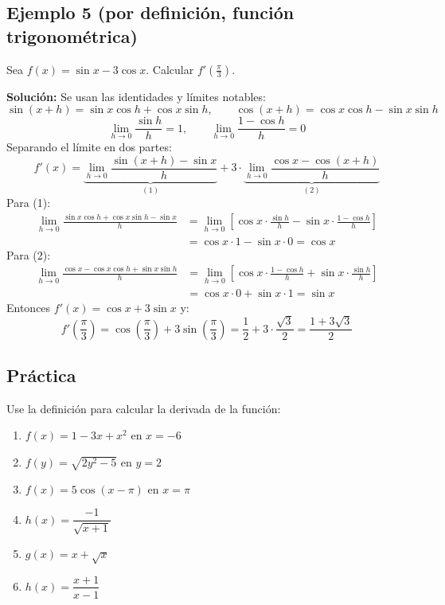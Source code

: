 \documentclass[12pt]{article}
\begin{document}
\subsection{Ejemplo 5 (por definición, función trigonométrica)}
Sea $f(x) = \sin x - 3\cos x$. Calcular $f'\left(\frac{\pi}{3}\right)$.

\textbf{Solución:} Se usan las identidades y límites notables:
\[
\sin(x + h) = \sin x \cos h + \cos x \sin h, \qquad \cos(x + h) = \cos x \cos h - \sin x \sin h
\]
\[
\lim_{h \to 0} \frac{\sin h}{h} = 1, \qquad \lim_{h \to 0} \frac{1 - \cos h}{h} = 0
\]
Separando el límite en dos partes:
\[
f'(x) = \underbrace{\lim_{h \to 0} \frac{\sin(x + h) - \sin x}{h}}_{(1)} + 3 \cdot \underbrace{\lim_{h \to 0} \frac{\cos x - \cos(x + h)}{h}}_{(2)}
\]
Para (1):
\begin{align*}
\lim_{h \to 0} \frac{\sin x \cos h + \cos x \sin h - \sin x}{h} &= \lim_{h \to 0} \left[ \cos x \cdot \frac{\sin h}{h} - \sin x \cdot \frac{1 - \cos h}{h} \right] \\
&= \cos x \cdot 1 - \sin x \cdot 0 = \cos x
\end{align*}
Para (2):
\begin{align*}
\lim_{h \to 0} \frac{\cos x - \cos x \cos h + \sin x \sin h}{h} &= \lim_{h \to 0} \left[ \cos x \cdot \frac{1 - \cos h}{h} + \sin x \cdot \frac{\sin h}{h} \right] \\
&= \cos x \cdot 0 + \sin x \cdot 1 = \sin x
\end{align*}
Entonces $f'(x) = \cos x + 3\sin x$ y:
\[
f'\left(\frac{\pi}{3}\right) = \cos\left(\frac{\pi}{3}\right) + 3\sin\left(\frac{\pi}{3}\right) = \frac{1}{2} + 3 \cdot \frac{\sqrt{3}}{2} = \frac{1 + 3\sqrt{3}}{2}
\]

\subsection{Práctica}
Use la definición para calcular la derivada de la función:
\begin{enumerate}
    \item $f(x) = 1 - 3x + x^2$ en $x = -6$
    \item $f(y) = \sqrt{2y^2 - 5}$ en $y = 2$
    \item $f(x) = 5\cos(x - \pi)$ en $x = \pi$
    \item $h(x) = \dfrac{-1}{\sqrt{x + 1}}$
    \item $g(x) = x + \sqrt{x}$
    \item $h(x) = \dfrac{x + 1}{x - 1}$
\end{enumerate}
\end{document}
